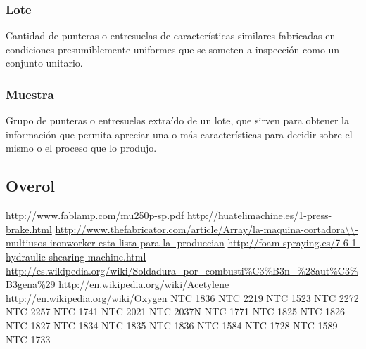 \documentclass[12pt,graphicx,caption,rotating]{article}
\begin{document}
\subsubsection{Lote}
\noindent
Cantidad de punteras o entresuelas de características similares fabricadas en
condiciones presumiblemente uniformes que se someten a inspección como un conjunto unitario.\cite{ntc2257}

\subsubsection{Muestra}
\noindent
Grupo de punteras o entresuelas extraído de un lote, que sirven para obtener la
información que permita apreciar una o más características para decidir sobre el mismo o el
proceso que lo produjo.\cite{ntc2257}



\subsection{Overol}
\noindent




\begin{thebibliography}{99}
  \url{http://www.fablamp.com/mu250p-sp.pdf}
  \url{http://huatelimachine.es/1-press-brake.html}
  \url{http://www.thefabricator.com/article/Array/la-maquina-cortadora\\-multiusos-ironworker-esta-lista-para-la--produccian}
  \url{http://foam-spraying.es/7-6-1-hydraulic-shearing-machine.html}
  \url{http://es.wikipedia.org/wiki/Soldadura_por_combusti\%C3\%B3n\_\%28aut\%C3\%B3gena\%29}
  \url{http://en.wikipedia.org/wiki/Acetylene}
  \url{http://en.wikipedia.org/wiki/Oxygen}
  NTC 1836
  NTC 2219
  NTC 1523
  NTC 2272
   NTC 2257
  NTC 1741
  NTC 2021
  NTC 2037N
  NTC 1771
  NTC 1825
  NTC 1826
  NTC 1827
  NTC 1834
  NTC 1835
  NTC 1836
  NTC 1584
  NTC 1728
  NTC 1589
  NTC 1733
 
\end{thebibliography}
\end{document}
